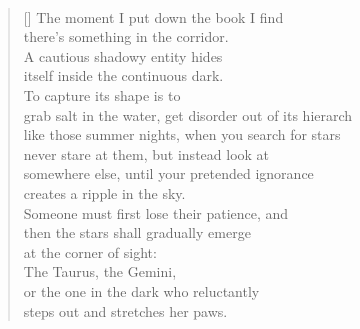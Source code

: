 \documentclass{book}
\begin{document}
\newpage
\poemtitle{\textcolor[RGB]{175,25,25}{How star gazers see through the dark}}
\hspace*{\fill} \\
\settowidth{\versewidth}{grab salt in the water, get disorder out of its hierarch}
\begin{verse}[\versewidth]
    The moment I put down the book I find\\
    there's something in the corridor.\\
    A cautious shadowy entity hides\\
    itself inside the continuous dark.\\
    To capture its shape is to\\
    grab salt in the water, get disorder out of its hierarch\\
    like those summer nights, when you search for stars\\
    never stare at them, but instead look at \\
    somewhere else, until your pretended ignorance\\
    creates a ripple in the sky. \\
    Someone must first lose their patience, and\\
    then the stars shall gradually emerge\\
    at the corner of sight:\\
    The Taurus, the Gemini,\\
    or the one in the dark who reluctantly\\
    steps out and stretches her paws. \\
\end{verse}
\end{document}

